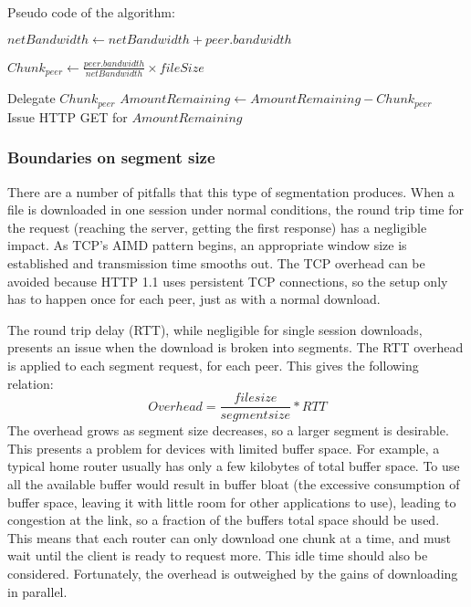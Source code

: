 \documentclass[12pt]{article}
\begin{document}
			Pseudo code of the algorithm:

			\begin{algorithmic}
					\State $netBandwidth\gets netBandwidth + peer.bandwidth$
				\EndFor

					\State $Chunk_{peer} \gets \frac{peer.bandwidth}{netBandwidth} \times{fileSize}$
				\EndFor

					Delegate $Chunk_{peer}$
					\State $AmountRemaining \gets AmountRemaining - Chunk_{peer}$
				\EndFor\\
				Issue HTTP GET for $AmountRemaining$
			\end{algorithmic}

		\subsubsection{Boundaries on segment size}

			There are a number of pitfalls that this type of segmentation produces. When a file is downloaded in one session under normal conditions, the round trip time for the request (reaching the server, getting the first response) has a negligible impact. As TCP's AIMD pattern begins, an appropriate window size is established and transmission time smooths out. The TCP overhead can be avoided because HTTP 1.1 uses persistent TCP connections, so the setup only has to happen once for each peer, just as with a normal download.

			The round trip delay (RTT), while negligible for single session downloads, presents an issue when the download is broken into segments. The RTT overhead is applied to each segment request, for each peer. This gives the following relation:
			$$Overhead = \frac{file size}{segment size} * RTT$$
			The overhead grows as segment size decreases, so a larger segment is desirable. This presents a problem for devices with limited buffer space. For example, a typical home router usually has only a few kilobytes of total buffer space. To use all the available buffer would result in buffer bloat (the excessive consumption of buffer space, leaving it with little room for other applications to use), leading to congestion at the link, so a fraction of the buffers total space should be used. This means that each router can only download one chunk at a time, and must wait until the client is ready to request more. This idle time should also be considered. Fortunately, the overhead is outweighed by the gains of downloading in parallel.
\end{document}
